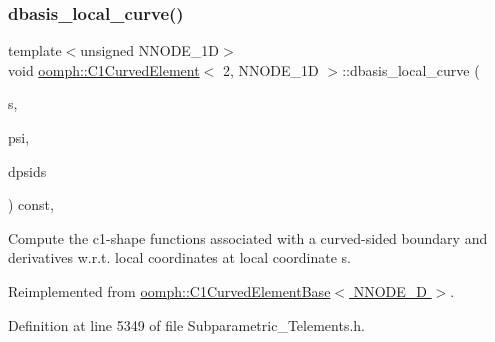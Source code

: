 \subsubsection{\texorpdfstring{dbasis\+\_\+local\+\_\+curve()}{dbasis\_local\_curve()}}
{\footnotesize\ttfamily template$<$unsigned N\+N\+O\+D\+E\+\_\+1D$>$ \\
void \hyperlink{classoomph_1_1C1CurvedElement}{oomph\+::\+C1\+Curved\+Element}$<$ 2, N\+N\+O\+D\+E\+\_\+1D $>$\+::dbasis\+\_\+local\+\_\+curve (\begin{DoxyParamCaption}\item[{const \hyperlink{classoomph_1_1Vector}{Vector}$<$ double $>$ \&}]{s,  }\item[{\hyperlink{classoomph_1_1Shape}{Shape} \&}]{psi,  }\item[{\hyperlink{classoomph_1_1DShape}{D\+Shape} \&}]{dpsids }\end{DoxyParamCaption}) const\hspace{0.3cm}{\ttfamily [inline]}, {\ttfamily [virtual]}}



Compute the c1-\/shape functions associated with a curved-\/sided boundary and derivatives w.\+r.\+t. local coordinates at local coordinate s. 



Reimplemented from \hyperlink{classoomph_1_1C1CurvedElementBase_a819553bb577933323c1e9c7943d04cad}{oomph\+::\+C1\+Curved\+Element\+Base$<$ N\+N\+O\+D\+E\+\_\+D $>$}.



Definition at line 5349 of file Subparametric\+\_\+\+Telements.\+h.

\mbox{\label{classoomph_1_1C1CurvedElement_3_012_00_01NNODE__1D_01_4_af4a862475f941e4bc210e8e366d5dffc}} 
